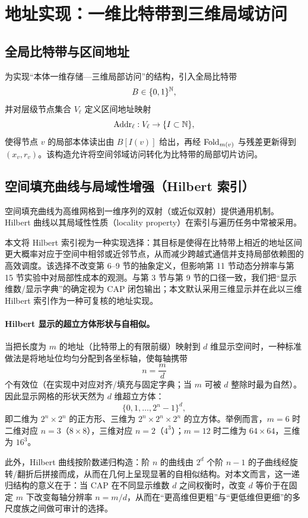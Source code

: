 \section{地址实现：一维比特带到三维局域访问}

\subsection{全局比特带与区间地址}

为实现“本体一维存储—三维局部访问”的结构，引入全局比特带
$$
B\in\{0,1\}^{\mathbb{N}},
$$
并对层级节点集合 $V_\ell$ 定义区间地址映射
$$
\mathrm{Addr}_\ell:V_\ell\to\{I\subset\mathbb{N}\},
$$
使得节点 $v$ 的局部本体读出由 $B[I(v)]$ 给出，再经 $\mathrm{Fold}_{m(v)}$ 与残差更新得到 $(x_v,r_v)$。该构造允许将空间邻域访问转化为比特带的局部切片访问。

\subsection{空间填充曲线与局域性增强（Hilbert 索引）}

空间填充曲线为高维网格到一维序列的双射（或近似双射）提供通用机制。Hilbert 曲线以其局域性性质（locality property）在索引与遍历任务中常被采用。\cite{wikipedia_hilbert_curve}

本文将 Hilbert 索引视为一种实现选择：其目标是使得在比特带上相近的地址区间更大概率对应于空间中相邻或近邻节点，从而减少跨越式通信并支持局部依赖图的高效调度。该选择不改变第 6--9 节的抽象定义，但影响第 11 节动态分辨率与第 15 节实验中对局部性成本的观测。\AuditTag 与第 3 节与第 9 节的口径一致，我们把“显示维数/显示字典”的确定视为 CAP 闭包输出；本文默认采用三维显示并在此以三维 Hilbert 索引作为一种可复核的地址实现。

\paragraph{Hilbert 显示的超立方体形状与自相似。}
当把长度为 $m$ 的地址（比特带上的有限前缀）映射到 $d$ 维显示空间时，一种标准做法是将地址位均匀分配到各坐标轴，使每轴携带
$$
n=\frac{m}{d}
$$
个有效位（在实现中对应对齐/填充与固定字典；当 $m$ 可被 $d$ 整除时最为自然）。因此显示网格的形状天然为 $d$ 维超立方体：
$$
\{0,1,\dots,2^n-1\}^d,
$$
即二维为 $2^n\times 2^n$ 的正方形、三维为 $2^n\times 2^n\times 2^n$ 的立方体。举例而言，$m=6$ 时二维对应 $n=3$（$8\times 8$），三维对应 $n=2$（$4^3$）；$m=12$ 时二维为 $64\times 64$，三维为 $16^3$。

此外，Hilbert 曲线按阶数递归构造：阶 $n$ 的曲线由 $2^d$ 个阶 $n-1$ 的子曲线经旋转/翻折后拼接而成，从而在几何上呈现显著的自相似结构。对本文而言，这一递归结构的意义在于：当 CAP 在不同显示维数 $d$ 之间权衡时，改变 $d$ 等价于在固定 $m$ 下改变每轴分辨率 $n=m/d$，从而在“更高维但更粗”与“更低维但更细”的多尺度族之间做可审计的选择。

